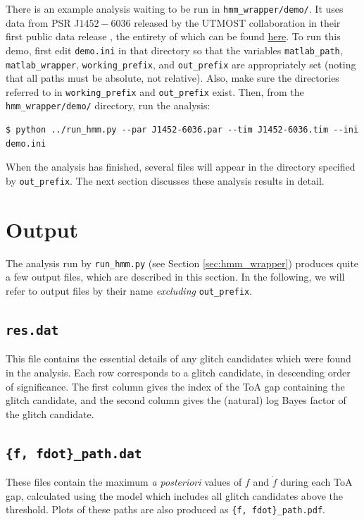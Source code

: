 \documentclass{article}
\begin{document}
There is an example analysis waiting to be run in \texttt{hmm\_wrapper/demo/}. It uses data from {PSR J${1452-6036}$} released by the UTMOST collaboration in their first public data release \citep{LowerBailes2020}, the entirety of which can be found \href{https://github.com/Molonglo/TimingDataRelease1}{here}.
To run this demo, first edit \texttt{demo.ini} in that directory so that the variables \texttt{matlab\_path}, \texttt{matlab\_wrapper}, \texttt{working\_prefix}, and \texttt{out\_prefix} are appropriately set (noting that all paths must be absolute, not relative).
Also, make sure the directories referred to in \texttt{working\_prefix} and \texttt{out\_prefix} exist.
Then, from the \texttt{hmm\_wrapper/demo/} directory, run the analysis:
\begin{lstlisting}
$ python ../run_hmm.py --par J1452-6036.par --tim J1452-6036.tim --ini demo.ini
\end{lstlisting}
When the analysis has finished, several files will appear in the directory specified by \texttt{out\_prefix}.
The next section discusses these analysis results in detail.
\section{Output}
The analysis run by \texttt{run\_hmm.py} (see Section \ref{sec:hmm_wrapper}) produces quite a few output files, which are described in this section.
In the following, we will refer to output files by their name \emph{excluding} \texttt{out\_prefix}.

\subsection{\texttt{res.dat}}
This file contains the essential details of any glitch candidates which were found in the analysis.
Each row corresponds to a glitch candidate, in descending order of significance.
The first column gives the index of the ToA gap containing the glitch candidate, and the second column gives the (natural) log Bayes factor of the glitch candidate.

\subsection{\texttt{\{f, fdot\}\_path.dat}}
These files contain  the maximum \emph{a posteriori} values of $f$ and $\dot{f}$ during each ToA gap, calculated using the model which includes all glitch candidates above the threshold.
Plots of these paths are also produced as \texttt{\{f, fdot\}\_path.pdf}.
\end{document}
